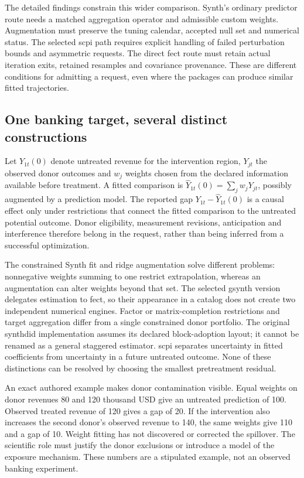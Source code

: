 The detailed findings constrain this wider comparison. Synth's ordinary
predictor route needs a matched aggregation operator and admissible custom
weights. Augmentation must preserve the tuning calendar, accepted null set
and numerical status. The selected scpi path requires explicit handling of
failed perturbation bounds and asymmetric requests. The direct fect route
must retain actual iteration exits, retained resamples and covariance
provenance. These are different conditions for admitting a request, even
where the packages can produce similar fitted trajectories.

\subsection{One banking target, several distinct constructions}
Let $Y_{1t}(0)$ denote untreated revenue for the intervention region, $Y_{jt}$
the observed donor outcomes and $w_j$ weights chosen from the declared
information available before treatment. A fitted comparison is
$\widehat Y_{1t}(0)=\sum_jw_jY_{jt}$, possibly augmented by a prediction
model. The reported gap $Y_{1t}-\widehat Y_{1t}(0)$ is a causal effect only
under restrictions that connect the fitted comparison to the untreated
potential outcome. Donor eligibility, measurement revisions, anticipation
and interference therefore belong in the request, rather than being inferred
from a successful optimization.~\citep{exec25_synthr_choice}

The constrained Synth fit and ridge augmentation solve different problems:
nonnegative weights summing to one restrict extrapolation, whereas an
augmentation can alter weights beyond that set. The selected gsynth version
delegates estimation to fect, so their appearance in a catalog does not create
two independent numerical engines. Factor or matrix-completion restrictions
and target aggregation differ from a single constrained donor portfolio.
The original synthdid implementation assumes its declared block-adoption
layout; it cannot be renamed as a general staggered estimator. scpi separates
uncertainty in fitted coefficients from uncertainty in a future untreated
outcome. None of these distinctions can be resolved by choosing the smallest
pretreatment residual.~\citep{exec24_synth_source,exec24_augsynth_source,
exec21_gsynth_wrapper,exec24_fect_source,exec23_synthdid_reuse_source,
exec24_scpi_source}

An exact authored example makes donor contamination visible. Equal weights
on donor revenues 80 and 120 thousand USD give an untreated prediction of
100. Observed treated revenue of 120 gives a gap of 20. If the intervention
also increases the second donor's observed revenue to 140, the same weights
give 110 and a gap of 10. Weight fitting has not discovered or corrected the
spillover. The scientific role must justify the donor exclusions or introduce
a model of the exposure mechanism. These numbers are a stipulated example,
not an observed banking experiment.~\citep{exec25_synthr_choice}

